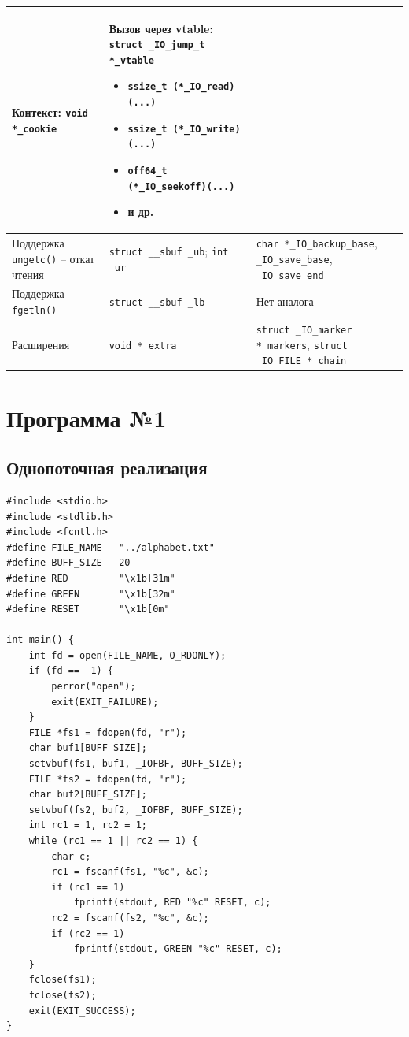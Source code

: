 \begin{longtable}{|>{\raggedright\arraybackslash}p{4.5cm}|>{\raggedright\arraybackslash}p{5.5cm}|>{\raggedright\arraybackslash}p{5.5cm}|}
	Контекст: \texttt{void *\_cookie} & 
	Вызов через vtable: \texttt{struct \_IO\_jump\_t *\_vtable}
	\begin{itemize}
		\item \texttt{ssize\_t (*\_IO\_read)(...)}
		\item \texttt{ssize\_t (*\_IO\_write)(...)}
		\item \texttt{off64\_t (*\_IO\_seekoff)(...)}
		\item и др.
	\end{itemize} \\
	\hline
	Поддержка \texttt{ungetc()} -- откат чтения & \texttt{struct \_\_sbuf \_ub}; \newline\texttt{int \_ur} & \texttt{char *\_IO\_backup\_base}, \texttt{\_IO\_save\_base}, \texttt{\_IO\_save\_end} \\
	\hline
	Поддержка \texttt{fgetln()} & \texttt{struct \_\_sbuf \_lb} & Нет аналога \\
	\hline
	Расширения & \texttt{void *\_extra} & \texttt{struct \_IO\_marker *\_markers}, \newline\texttt{struct \_IO\_FILE *\_chain} \\
	\hline
\end{longtable}

\newpage
\section{Программа №1}

\subsection*{Однопоточная реализация}
\begin{lstlisting}[caption=Первая программа (однопоточная),label=lst:FILEstruct]
#include <stdio.h>
#include <stdlib.h>
#include <fcntl.h>
#define FILE_NAME 	"../alphabet.txt"
#define BUFF_SIZE 	20
#define RED     	"\x1b[31m"
#define GREEN   	"\x1b[32m"
#define RESET   	"\x1b[0m"

int main() {
	int fd = open(FILE_NAME, O_RDONLY);
	if (fd == -1) {
		perror("open");
		exit(EXIT_FAILURE);
	}
	FILE *fs1 = fdopen(fd, "r");
	char buf1[BUFF_SIZE];
	setvbuf(fs1, buf1, _IOFBF, BUFF_SIZE); 
	FILE *fs2 = fdopen(fd, "r");
	char buf2[BUFF_SIZE];
	setvbuf(fs2, buf2, _IOFBF, BUFF_SIZE);
	int rc1 = 1, rc2 = 1;
	while (rc1 == 1 || rc2 == 1) {
		char c;
		rc1 = fscanf(fs1, "%c", &c);
		if (rc1 == 1)
			fprintf(stdout, RED "%c" RESET, c);
		rc2 = fscanf(fs2, "%c", &c);
		if (rc2 == 1)
			fprintf(stdout, GREEN "%c" RESET, c);
	}
	fclose(fs1); 
	fclose(fs2);
	exit(EXIT_SUCCESS);
}
\end{lstlisting}


